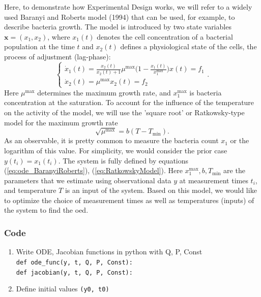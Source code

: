 \documentclass[10pt,A4paper]{article}
\newcommand{\mbx}{\mathbf{x}}
\begin{document}
Here, to demonstrate how Experimental Design works, we will refer to a widely used Baranyi and Roberts model (1994) that can be used, for example, to describe bacteria growth.
The model is introduced by two state variables $\mbx = (x_1, x_2)$, where $x_1(t)$ denotes the cell concentration of a bacterial population at the time $t$ and $x_2(t)$ defines a physiological state of the cells, the process of adjustment (lag-phase):
\begin{equation}
    \begin{cases}
    \dot x_1(t) = \frac{x_2(t)}{x_2(t) + 1} \mu^\text{max} \big(1 - \frac{x_1(t)}{x_1^\text{max}}\big) x(t)  = f_1 \\
    \dot x_2(t) = \mu^\text{max}  x_2(t) = f_2
    \end{cases}.
    \label{eq:ode_BaranyiRoberts}
\end{equation}
Here $\mu^\text{max}$ determines the maximum growth rate, and $x_1^\text{max}$ is bacteria concentration at the saturation. 
To account for the influence of the temperature on the activity of the model, we will use the 'square root' or Ratkowsky-type model for the maximum growth rate
\begin{equation}
    \sqrt{\mu^\text{max}} = b (T - T_\text{min}).
    \label{eq:RatkowskyModel}
\end{equation} 
As an observable, it is pretty common to measure the bacteria count $x_1$ or the logarithm of this value. 
For simplicity, we would consider the prior case $y(t_i) = x_1(t_i)$.
The system is fully defined by equations (\ref{eq:ode_BaranyiRoberts}), (\ref{eq:RatkowskyModel}).
Here $x_1^\text{max}, b, T_\text{min}$ are the parameters that we estimate using observational data $y$ at measurement times $t_i$, and temperature $T$ is an input of the system.
Based on this model, we would like to optimize the choice of measurement times as well as temperatures (inputs) of the system to find the \acl{oed}.


\subsubsection*{Code}
\begin{enumerate}
    \item Write ODE, Jacobian functions in python with Q, P, Const\\
    \texttt{def ode_func(y, t, Q, P, Const):}\\
    \texttt{def jacobian(y, t, Q, P, Const):}
    \item Define initial values \texttt{(y0, t0)}
\end{enumerate}
%
\end{document}
